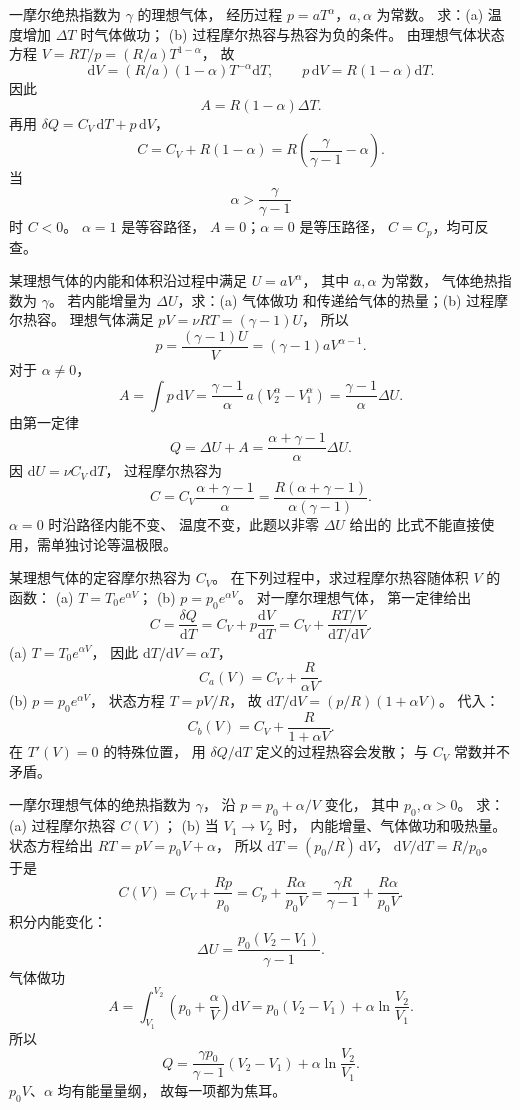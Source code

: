 一摩尔绝热指数为 $\gamma$ 的理想气体，
经历过程 $p=aT^\alpha$，$a,\alpha$ 为常数。
求：(a) 温度增加 $\Delta T$ 时气体做功；
(b) 过程摩尔热容与热容为负的条件。
\exsolution
由理想气体状态方程
$V=RT/p=(R/a)T^{1-\alpha}$，
故
\[
\mathrm dV=(R/a)(1-\alpha)T^{-\alpha}\mathrm dT,
\qquad p\,\mathrm dV=R(1-\alpha)\mathrm dT.
\]
因此
\[
\boxed{A=R(1-\alpha)\Delta T}.
\]
再用
$\delta Q=C_V\,\mathrm dT+p\,\mathrm dV$，
\[
\boxed{C=C_V+R(1-\alpha)
=R\left(\frac{\gamma}{\gamma-1}-\alpha\right)}.
\]
当
\[
\boxed{\alpha>\frac{\gamma}{\gamma-1}}
\]
时 $C<0$。
\excheck $\alpha=1$ 是等容路径，
$A=0$；$\alpha=0$ 是等压路径，
$C=C_p$，均可反查。

某理想气体的内能和体积沿过程中满足
$U=aV^\alpha$，
其中 $a,\alpha$ 为常数，
气体绝热指数为 $\gamma$。
若内能增量为 $\Delta U$，求：(a) 气体做功
和传递给气体的热量；(b) 过程摩尔热容。
\exsolution
理想气体满足
$pV=\nu RT=(\gamma-1)U$，
所以
\[
p=\frac{(\gamma-1)U}{V}
=(\gamma-1)aV^{\alpha-1}.
\]
对于 $\alpha\ne0$，
\[
A=\int p\,\mathrm dV
=\frac{\gamma-1}{\alpha}
\,a(V_2^\alpha-V_1^\alpha)
=\boxed{\frac{\gamma-1}{\alpha}\Delta U}.
\]
由第一定律
\[
\boxed{Q=\Delta U+A
=\frac{\alpha+\gamma-1}{\alpha}\Delta U}.
\]
因 $\mathrm dU=\nu C_V\,\mathrm dT$，
过程摩尔热容为
\[
\boxed{C=C_V\frac{\alpha+\gamma-1}{\alpha}
=\frac{R(\alpha+\gamma-1)}
{\alpha(\gamma-1)}}.
\]
\excheck $\alpha=0$ 时沿路径内能不变、
温度不变，此题以非零 $\Delta U$ 给出的
比式不能直接使用，需单独讨论等温极限。

某理想气体的定容摩尔热容为 $C_V$。
在下列过程中，求过程摩尔热容随体积 $V$ 的函数：
(a) $T=T_0e^{\alpha V}$；
(b) $p=p_0e^{\alpha V}$。
\exsolution
对一摩尔理想气体，
第一定律给出
\[
C=\frac{\delta Q}{\mathrm dT}
=C_V+p\frac{\mathrm dV}{\mathrm dT}
=C_V+\frac{RT/V}{\mathrm dT/\mathrm dV}.
\]
(a) $T=T_0e^{\alpha V}$，
因此 $\mathrm dT/\mathrm dV=\alpha T$，
\[
\boxed{C_a(V)=C_V+\frac R{\alpha V}}.
\]
(b) $p=p_0e^{\alpha V}$，
状态方程 $T=pV/R$，
故
$\mathrm dT/\mathrm dV=(p/R)(1+\alpha V)$。
代入：
\[
\boxed{C_b(V)=C_V+\frac R{1+\alpha V}}.
\]
\excheck 在 $T'(V)=0$ 的特殊位置，
用 $\delta Q/\mathrm dT$ 定义的过程热容会发散；
与 $C_V$ 常数并不矛盾。

一摩尔理想气体的绝热指数为 $\gamma$，
沿 $p=p_0+\alpha/V$ 变化，
其中 $p_0,\alpha>0$。
求：(a) 过程摩尔热容 $C(V)$；
(b) 当 $V_1\to V_2$ 时，
内能增量、气体做功和吸热量。
\exsolution
状态方程给出
$RT=pV=p_0V+\alpha$，
所以 $\mathrm dT=(p_0/R)\,\mathrm dV$，
$\mathrm dV/\mathrm dT=R/p_0$。
于是
\[
\boxed{C(V)=C_V+\frac{Rp}{p_0}
=C_p+\frac{R\alpha}{p_0V}
=\frac{\gamma R}{\gamma-1}+\frac{R\alpha}{p_0V}}.
\]
积分内能变化：
\[
\boxed{\Delta U=\frac{p_0(V_2-V_1)}{\gamma-1}}.
\]
气体做功
\[
\boxed{A=\int_{V_1}^{V_2}
\left(p_0+\frac{\alpha}{V}\right)\mathrm dV
=p_0(V_2-V_1)+\alpha\ln\frac{V_2}{V_1}}.
\]
所以
\[
\boxed{Q=\frac{\gamma p_0}{\gamma-1}(V_2-V_1)
+\alpha\ln\frac{V_2}{V_1}}.
\]
\excheck $p_0V$、$\alpha$ 均有能量量纲，
故每一项都为焦耳。

